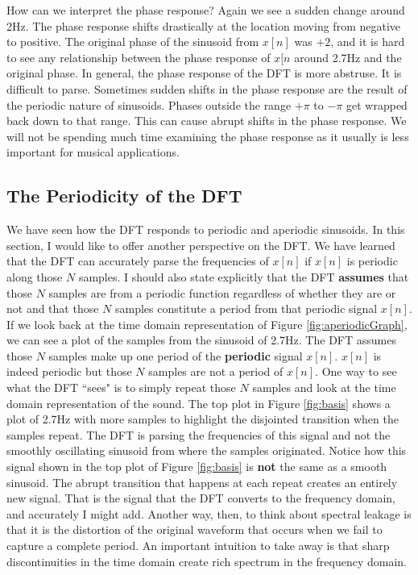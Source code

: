 How can we interpret the phase response?  Again we see a sudden change around 2Hz.  The phase response shifts
drastically at the location moving from negative to positive.  The original phase of the sinusoid from $x[n]$ was $+2$,
and it is hard to see any relationship between the phase response of $x[n$ around 2.7Hz and the original phase.  In 
general, the phase response of the DFT is more abstruse.  It is difficult to parse.  Sometimes sudden shifts in the
phase response are the result of the periodic nature of sinusoids.  Phases outside the range $+\pi$ to $-\pi$ get
wrapped back down to that range.  This can cause abrupt shifts in the phase response.  We will not be spending
much time examining the phase response as it usually is less important for musical applications. 

\subsection*{The Periodicity of the DFT}

We have seen how the DFT responds to periodic and aperiodic sinusoids.  In this section, I would like to offer 
another perspective on the DFT.  We have learned that the DFT can accurately parse the frequencies of $x[n]$ if
$x[n]$ is periodic along those $N$ samples.  I should also state explicitly that the DFT \textbf{assumes} that
those $N$ samples are from a periodic function regardless of whether they are or not and that those $N$ samples
constitute a period from that periodic signal $x[n]$.  If we look back at the time
domain representation of Figure \ref{fig:aperiodicGraph}, we can see a plot of the samples from the sinusoid of
2.7Hz.  The DFT assumes those $N$ samples make up one period of the \textbf{periodic} signal $x[n]$.  $x[n]$
is indeed periodic but those $N$ samples are not a period of $x[n]$.  One way to see what the DFT ``sees" is to
simply repeat those $N$ samples and look at the time domain representation of the sound.  The top plot in Figure
\ref{fig:basis} shows a plot of 2.7Hz with more samples to highlight the disjointed transition when the samples
repeat.  The DFT is parsing the frequencies of this signal and not the smoothly oscillating sinusoid from where the
samples originated.  Notice how this signal shown in the top plot of Figure \ref{fig:basis} is \textbf{not} the
same as a smooth sinusoid.  The abrupt transition that happens at each repeat creates an entirely new signal.  
That is the signal that the DFT converts to the frequency domain, and accurately I might add.  Another way, then,
to think about spectral leakage is that it is the distortion of the original waveform that occurs when we fail
to capture a complete period.  An important intuition to take away is that sharp discontinuities in the time domain
create rich spectrum in the frequency domain.


